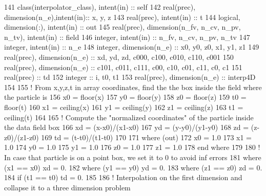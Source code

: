 \begin{DoxyCode}
141     \textcolor{keywordtype}{class}(interpolator\_class), \textcolor{keywordtype}{intent(in)} :: self
142     \textcolor{keywordtype}{real(prec)}, \textcolor{keywordtype}{dimension(n\_e)},\textcolor{keywordtype}{intent(in)}:: x, y, z
143     \textcolor{keywordtype}{real(prec)}, \textcolor{keywordtype}{intent(in)} :: t
144     \textcolor{keywordtype}{logical}, \textcolor{keywordtype}{dimension(:)}, \textcolor{keywordtype}{intent(in)} :: out
145     \textcolor{keywordtype}{real(prec)}, \textcolor{keywordtype}{dimension(n\_fv, n\_cv, n\_pv, n\_tv)}, \textcolor{keywordtype}{intent(in)} :: field
146     \textcolor{keywordtype}{integer}, \textcolor{keywordtype}{intent(in)} :: n\_fv, n\_cv, n\_pv, n\_tv
147     \textcolor{keywordtype}{integer}, \textcolor{keywordtype}{intent(in)} :: n\_e
148     \textcolor{keywordtype}{integer}, \textcolor{keywordtype}{dimension(n\_e)} :: x0, y0, z0, x1, y1, z1
149     \textcolor{keywordtype}{real(prec)}, \textcolor{keywordtype}{dimension(n\_e)} :: xd, yd, zd, c000, c100, c010, c110, c001
150     \textcolor{keywordtype}{real(prec)}, \textcolor{keywordtype}{dimension(n\_e)} :: c101, c011, c111, c00, c10, c01, c11, c0, c1
151     \textcolor{keywordtype}{real(prec)} :: td
152     \textcolor{keywordtype}{integer} :: i, t0, t1
153     \textcolor{keywordtype}{real(prec)}, \textcolor{keywordtype}{dimension(n\_e)} :: interp4D
154 
155     \textcolor{comment}{! From x,y,z,t in array coordinates, find the the box inside the field where the particle is}
156     x0 = floor(x)
157     y0 = floor(y)
158     z0 = floor(z)
159     t0 = floor(t)
160     x1 = ceiling(x)
161     y1 = ceiling(y)
162     z1 = ceiling(z)
163     t1 = ceiling(t)
164 
165     \textcolor{comment}{! Compute the "normalized coordinates" of the particle inside the data field box}
166     xd = (x-x0)/(x1-x0)
167     yd = (y-y0)/(y1-y0)
168     zd = (z-z0)/(z1-z0)
169     td = (t-t0)/(t1-t0)
170 
171     \textcolor{keywordflow}{where} (out)
172         x0 = 1.0
173         x1 = 1.0
174         y0 = 1.0
175         y1 = 1.0
176         z0 = 1.0
177         z1 = 1.0
178 \textcolor{keywordflow}{    end where}
179 
180     \textcolor{comment}{! In case that particle is on a point box, we set it to 0 to avoid inf errors}
181     \textcolor{keywordflow}{where} (x1 == x0) xd = 0.
182     \textcolor{keywordflow}{where} (y1 == y0) yd = 0.
183     \textcolor{keywordflow}{where} (z1 == z0) zd = 0.
184     \textcolor{keywordflow}{if} (t1 == t0)    td = 0.
185 
186     \textcolor{comment}{! Interpolation on the first dimension and collapse it to a three dimension problem}

\end{DoxyCode}
